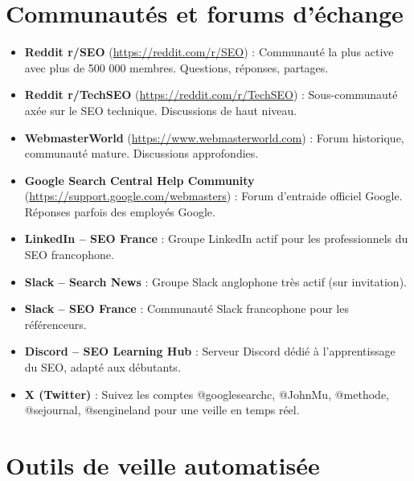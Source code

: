 \documentclass[12pt,a4paper,twoside]{report}
\begin{document}
\section*{Communautés et forums d'échange}

\begin{itemize}
    \item \textbf{Reddit r/SEO} (\url{https://reddit.com/r/SEO}) : Communauté la plus active avec plus de 500 000 membres. Questions, réponses, partages.
    \item \textbf{Reddit r/TechSEO} (\url{https://reddit.com/r/TechSEO}) : Sous-communauté axée sur le SEO technique. Discussions de haut niveau.
    \item \textbf{WebmasterWorld} (\url{https://www.webmasterworld.com}) : Forum historique, communauté mature. Discussions approfondies.
    \item \textbf{Google Search Central Help Community} (\url{https://support.google.com/webmasters}) : Forum d'entraide officiel Google. Réponses parfois des employés Google.
    \item \textbf{LinkedIn -- SEO France} : Groupe LinkedIn actif pour les professionnels du SEO francophone.
    \item \textbf{Slack -- Search News} : Groupe Slack anglophone très actif (sur invitation).
    \item \textbf{Slack -- SEO France} : Communauté Slack francophone pour les référenceurs.
    \item \textbf{Discord -- SEO Learning Hub} : Serveur Discord dédié à l'apprentissage du SEO, adapté aux débutants.
    \item \textbf{X (Twitter)} : Suivez les comptes @googlesearchc, @JohnMu, @methode, @sejournal, @sengineland pour une veille en temps réel.
\end{itemize}

\section*{Outils de veille automatisée}
\end{document}
